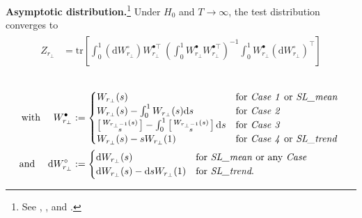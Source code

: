 \textbf{Asymptotic distribution.}\footnote{See \citet[Ch.~11.2]{Johansen1996}, \citet[Ch.~8.2]{Lutkepohl2005}, and \citet[p.~24, Eq.~2.9]{Trenkler2008}.} Under $ H_0 $ and $ T \to \infty $, the test distribution converges to
\begin{align} \label{eq:asympDistr}
\begin{split}
	Z_{r_\perp} & = \text{tr} \left[ \int_0^1 \left(\text{d} W^\circ_{r_\perp} \right) W_{r_\perp}^{\bullet \top} \ \left( \int_0^1 W^\bullet_{r_\perp} W_{r_\perp}^{\bullet \top} \right)^{-1} \int_0^1 W^\bullet_{r_\perp} \left(\text{d} W^\circ_{r_\perp}\right)^\top \right]
\end{split}
\end{align}\\[-27pt]
\begin{align} \label{eq:asympDistr2}
\begin{split}
	\text{with \quad} W^\bullet_{r_\perp} & := 
	\begin{cases}
	W_{r_\perp} {\left( s \right)} & \text{for \textit{Case 1} or \textit{SL\_mean} } \\
	W_{r_\perp} {\left( s \right)} - \int_0^1 W_{r_\perp}{\left( s \right)}\text{d} s & \text{for \textit{Case 2} } \\
	\left[ \begin{smallmatrix}
	W_{r_\perp-1} {\left( s \right)} \\ s
	\end{smallmatrix} \right] - \int_0^1 \left[ \begin{smallmatrix}
	W_{r_\perp-1} {\left( s \right)} \\ s
	\end{smallmatrix} \right] \text{d} s & \text{for \textit{Case 3} } \\
	W_{r_\perp} {\left( s \right)} - sW_{r_\perp}{\left( 1 \right)} & \text{for \textit{Case 4} or \textit{SL\_trend}} \\
	\end{cases} \\
	\text{and \quad} \text{d} W^\circ_{r_\perp} & := 
	\begin{cases}
	\text{d} W_{r_\perp} {\left( s \right)} & \text{for \textit{SL\_mean} or any \textit{Case}} \\
	\text{d} W_{r_\perp} {\left( s \right)} - \text{d} sW_{r_\perp}{\left( 1 \right)} & \text{for \textit{SL\_trend}.} \\
\end{cases}
\end{split}
\end{align}
